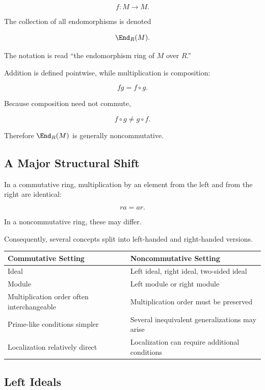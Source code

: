 \[ f:M\to M. \]

The collection of all endomorphisms is denoted

\[ \End_R(M). \]

The notation is read ``the endomorphism ring of \(M\) over \(R\).''

Addition is defined pointwise, while multiplication is composition:

\[ fg=f\circ g. \]

Because composition need not commute,

\[ f\circ g\neq g\circ f. \]

Therefore \(\End_R(M)\) is generally noncommutative.

\subsection{A Major Structural Shift}
\label{subsec:noncommutative-structural-shift}

In a commutative ring, multiplication by an element from the left and from
the right are identical:

\[ ra=ar. \]

In a noncommutative ring, these may differ.

Consequently, several concepts split into left-handed and right-handed
versions.

\begin{center}
\begin{tabularx}{0.9\textwidth}{@{}XX@{}}
\toprule
\textbf{Commutative Setting} & \textbf{Noncommutative Setting}\\
\midrule
Ideal & Left ideal, right ideal, two-sided ideal\\
Module & Left module or right module\\
Multiplication order often interchangeable & Multiplication order must be preserved\\
Prime-like conditions simpler & Several inequivalent generalizations may arise\\
Localization relatively direct & Localization can require additional conditions\\
\bottomrule
\end{tabularx}
\end{center}

\subsection{Left Ideals}
\label{subsec:left-ideals}

